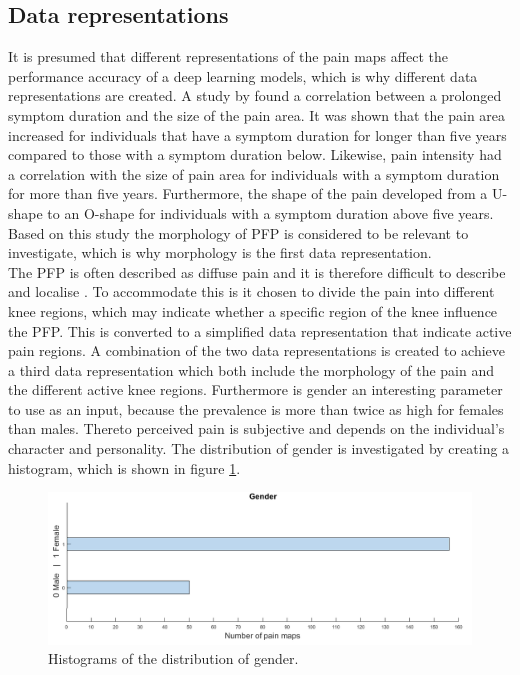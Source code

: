 \subsection{Data representations} \label{sec:representation}
It is presumed that different representations of the pain maps affect the performance accuracy of a deep learning models, which is why different data representations are created.
A study by \citeauthor{Boudreau2017} found a correlation between a prolonged symptom duration and the size of the pain area. It was shown that the pain area increased for individuals that have a symptom duration for longer than five years compared to those with a symptom duration below. Likewise, pain intensity had a correlation with the size of pain area for individuals with a symptom duration for more than five years. Furthermore, the shape of the pain developed from a U-shape to an O-shape for individuals with a symptom duration above five years.\citep{Boudreau2017} \\
Based on this study the morphology of PFP is considered to be relevant to investigate, which is why morphology is the first data representation.\\

\noindent
The PFP is often described as diffuse pain and it is therefore difficult to describe and localise \citep{Witvrouw2014}. To accommodate this is it chosen to divide the pain into different knee regions, which may indicate whether a specific region of the knee influence the PFP. This is converted to a simplified data representation that indicate active pain regions.
A combination of the two data representations is created to achieve a third data representation which both include the morphology of the pain and the different active knee regions.
\noindent
Furthermore is gender an interesting parameter to use as an input, because the prevalence is more than twice as high for females than males. Thereto perceived pain is subjective and depends on the individual's character and personality. The distribution of gender is investigated by creating a histogram, which is shown in figure \ref{fig:histogender}.

\begin{figure} [H]
\centering
\includegraphics[width=1\textwidth]{figures/histoGender}
\caption{Histograms of the distribution of gender.}
\label{fig:histogender}
\end{figure}

